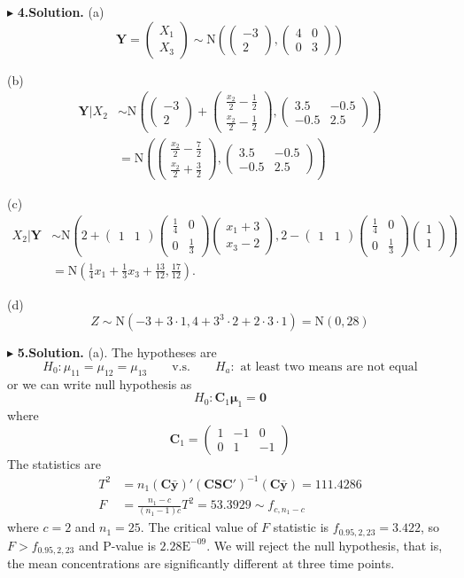\documentclass[letterpaper, 12pt]{article}
\newcommand{\ba}{$$\begin{aligned}}
\newcommand{\ea}{\end{aligned}$$}
\newcommand{\lma}{\left(\begin{matrix}}
\newcommand{\rma}{\end{matrix}\right)}
\begin{document}
$\blacktriangleright$ \textbf{4.\quad Solution.} 
(a) 
$$
\bm{Y}=\lma X_1\\X_3\rma\sim \text{N}\left(\lma -3 \\2\rma,\lma 4&0\\0&3\rma\right)
$$

(b)
\ba
\bm{Y}|X_2&\sim\text{N}\left(\lma -3\\2\rma+\lma \frac{x_2}{2}-\frac12\\\frac{x_2}2-\frac12\rma,\lma 3.5 &-0.5\\-0.5 &2.5\rma\right)\\
&=\text{N}\left(\lma \frac{x_2}{2}-\frac72\\\frac{x_2}2+\frac32\rma,\lma 3.5 &-0.5\\-0.5 &2.5\rma\right)
\ea


(c)
\ba
X_2|\bm{Y}&\sim\text{N}\left(2+\lma 1&1\rma\lma \frac14&0\\0&\frac13\rma\lma x_1+3\\x_3-2\rma, 2-\lma 1&1\rma\lma \frac14&0\\0&\frac13\rma\lma1\\1\rma\right)\\
&=\text{N}\left(\frac14x_1+\frac13x_3+\frac{13}{12},\frac{17}{12}\right).
\ea

(d) 
$$
Z\sim\text{N}(-3+3\cdot1,4+3^3\cdot2+2\cdot3\cdot1)=\text{N}(0,28)
$$

$\blacktriangleright$ \textbf{5.\quad Solution.}
(a). The hypotheses are
$$
H_0:\mu_{11}=\mu_{12}=\mu_{13}\qquad\text{v.s.}\qquad H_a: \text{ at least two means are not equal}
$$
or we can write null hypothesis as
$$
H_0: \bm{C}_1\bm{\mu}_1=\bm{0}
$$
where
$$
\bm{C}_1=\lma 1 &-1 &0\\ 0 &1 &-1\rma
$$
The statistics are
\ba
T^2&=n_1(\bm{C\bar{y}})'(\bm{CSC}')^{-1}(\bm{C\bar{y}})=111.4286\\
F&=\frac{n_1-c}{(n_1-1)c}T^2=53.3929\sim f_{c,n_1-c}
\ea
where $c=2$ and $n_1=25$. The critical value of $F$ statistic is $f_{0.95,2,23}=3.422$, so $F>f_{0.95,2,23}$ and P-value is $2.28\text{E}^{-09}$. We will reject the  null hypothesis, that is, the mean concentrations are significantly different at three time points.
\end{document}
